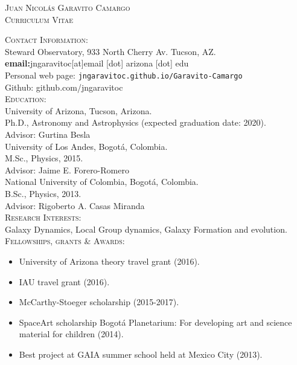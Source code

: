 \documentclass[letterpaper]{article}
\begin{document}
\begin{center}
\textsc{\LARGE Juan Nicol\'as Garavito Camargo}\\
\textsc{\large Curriculum Vitae}\\
\end{center}

\textsc{\Large Contact Information:}\\

Steward Observatory, 933 North Cherry Av. Tucson, AZ.\\
\indent \textbf{email:}jngaravitoc[at]email [dot] arizona [dot] edu\\
\indent Personal web page:
\verb+jngaravitoc.github.io/Garavito-Camargo+\\
\indent Github: github.com/jngaravitoc \\

\textsc{\Large Education:}\\

University of Arizona, Tucson, Arizona.\\
\indent Ph.D., Astronomy and Astrophysics (expected
graduation date: 2020).\\
\indent Advisor: Gurtina Besla\\

University of Los Andes, Bogot\'a, Colombia.\\
\indent M.Sc., Physics, 2015.\\
\indent Advisor: Jaime E. Forero-Romero\\

National University of Colombia, Bogot\'a, Colombia.\\
\indent B.Sc., Physics, 2013.\\
\indent Advisor: Rigoberto A. Casas Miranda\\

\textsc{\Large Research Interests:}\\

Galaxy Dynamics, Local Group dynamics, Galaxy Formation and evolution.\\


\textsc{\Large Fellowships, grants \& Awards:}\\
\begin{itemize}
\setlength\itemsep{0em}
\item University of Arizona theory travel grant (2016). \\
\item IAU travel grant (2016).\\
\item McCarthy-Stoeger scholarship (2015-2017).\\
\item SpaceArt scholarship Bogot\'a Planetarium: For developing art and science material for children (2014). \\
\item Best project at GAIA summer school held at Mexico City (2013).\\
\end{itemize}
\end{document}

